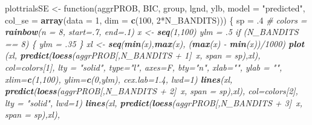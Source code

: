 \documentclass[11pt,,]{article}
\newenvironment{Shaded}{\begin{snugshade}}{\end{snugshade}}
\newcommand{\KeywordTok}[1]{\textcolor[rgb]{0.13,0.29,0.53}{\textbf{{#1}}}}
\newcommand{\DataTypeTok}[1]{\textcolor[rgb]{0.13,0.29,0.53}{{#1}}}
\newcommand{\DecValTok}[1]{\textcolor[rgb]{0.00,0.00,0.81}{{#1}}}
\newcommand{\FloatTok}[1]{\textcolor[rgb]{0.00,0.00,0.81}{{#1}}}
\newcommand{\StringTok}[1]{\textcolor[rgb]{0.31,0.60,0.02}{{#1}}}
\newcommand{\CommentTok}[1]{\textcolor[rgb]{0.56,0.35,0.01}{\textit{{#1}}}}
\newcommand{\NormalTok}[1]{{#1}}
\begin{document}
\begin{Shaded}
\begin{Highlighting}[]
\NormalTok{plottrialsSE <-}\StringTok{ }\NormalTok{function(aggrPROB, BIC, group, lgnd, ylb, }\DataTypeTok{model =} \StringTok{"predicted"}\NormalTok{, }
                         \DataTypeTok{col_se =} \KeywordTok{array}\NormalTok{(}\DataTypeTok{data =} \DecValTok{1}\NormalTok{, }\DataTypeTok{dim =} \KeywordTok{c}\NormalTok{(}\DecValTok{100}\NormalTok{, }\DecValTok{2}\NormalTok{*N_BANDITS))) \{}
    \NormalTok{sp =}\StringTok{ }\NormalTok{.}\DecValTok{4} \CommentTok{# % of the points}
    \NormalTok{colors =}\StringTok{ }\KeywordTok{rainbow}\NormalTok{(}\DataTypeTok{n =} \DecValTok{8}\NormalTok{, }\DataTypeTok{start=}\NormalTok{.}\DecValTok{7}\NormalTok{, }\DataTypeTok{end=}\NormalTok{.}\DecValTok{1}\NormalTok{)}
    \NormalTok{x <-}\StringTok{ }\KeywordTok{seq}\NormalTok{(}\DecValTok{1}\NormalTok{,}\DecValTok{100}\NormalTok{)}
    \NormalTok{ylm =}\StringTok{ }\NormalTok{.}\DecValTok{5}
    \NormalTok{if (N_BANDITS ==}\StringTok{ }\DecValTok{8}\NormalTok{) \{}
        \NormalTok{ylm =}\StringTok{ }\NormalTok{.}\DecValTok{35}
    \NormalTok{\}}
    \NormalTok{xl <-}\StringTok{ }\KeywordTok{seq}\NormalTok{(}\KeywordTok{min}\NormalTok{(x),}\KeywordTok{max}\NormalTok{(x), (}\KeywordTok{max}\NormalTok{(x) -}\StringTok{ }\KeywordTok{min}\NormalTok{(x))/}\DecValTok{1000}\NormalTok{)}
    \KeywordTok{plot} \NormalTok{(xl, }\KeywordTok{predict}\NormalTok{(}\KeywordTok{loess}\NormalTok{(aggrPROB[,N_BANDITS +}\StringTok{ }\DecValTok{1}\NormalTok{]~x, }\DataTypeTok{span =} \NormalTok{sp),xl), }
          \DataTypeTok{col=}\NormalTok{colors[}\DecValTok{1}\NormalTok{], }\DataTypeTok{lty =} \StringTok{"solid"}\NormalTok{, }\DataTypeTok{type=}\StringTok{"l"}\NormalTok{, }\DataTypeTok{axes=}\NormalTok{F,  }\DataTypeTok{bty=}\StringTok{"n"}\NormalTok{, }\DataTypeTok{xlab=}\StringTok{""}\NormalTok{, }
          \DataTypeTok{ylab =} \StringTok{""}\NormalTok{, }\DataTypeTok{xlim=}\KeywordTok{c}\NormalTok{(}\DecValTok{1}\NormalTok{,}\DecValTok{100}\NormalTok{), }\DataTypeTok{ylim=}\KeywordTok{c}\NormalTok{(}\DecValTok{0}\NormalTok{,ylm), }\DataTypeTok{cex.lab=}\FloatTok{1.4}\NormalTok{,  }\DataTypeTok{lwd=}\DecValTok{1}\NormalTok{)}
    \KeywordTok{lines}\NormalTok{(xl, }\KeywordTok{predict}\NormalTok{(}\KeywordTok{loess}\NormalTok{(aggrPROB[,N_BANDITS +}\StringTok{ }\DecValTok{2}\NormalTok{]~x, }\DataTypeTok{span =} \NormalTok{sp),xl), }
          \DataTypeTok{col=}\NormalTok{colors[}\DecValTok{2}\NormalTok{], }\DataTypeTok{lty =} \StringTok{"solid"}\NormalTok{, }\DataTypeTok{lwd=}\DecValTok{1}\NormalTok{)}
    \KeywordTok{lines}\NormalTok{(xl, }\KeywordTok{predict}\NormalTok{(}\KeywordTok{loess}\NormalTok{(aggrPROB[,N_BANDITS +}\StringTok{ }\DecValTok{3}\NormalTok{]~x, }\DataTypeTok{span =} \NormalTok{sp),xl), }
}
\end{Highlighting}
\end{Shaded}
\end{document}
